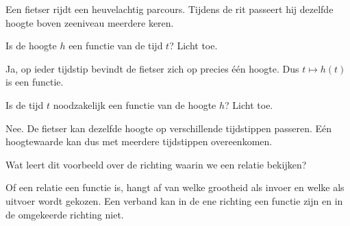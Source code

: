 \documentclass{ximera}
\begin{document}
\begin{oefening}{\oefG}

Een fietser rijdt een heuvelachtig parcours. Tijdens de rit passeert hij
dezelfde hoogte boven zeeniveau meerdere keren.

\begin{question}
Is de hoogte \(h\) een functie van de tijd \(t\)? Licht toe.

\begin{oplossing}
Ja, op ieder tijdstip bevindt de fietser zich op precies één hoogte.
Dus \(t\mapsto h(t)\) is een functie.
\end{oplossing}
\end{question}

\begin{question}
Is de tijd \(t\) noodzakelijk een functie van de hoogte \(h\)?
Licht toe.

\begin{oplossing}
Nee. De fietser kan dezelfde hoogte op verschillende tijdstippen passeren.
Eén hoogtewaarde kan dus met meerdere tijdstippen overeenkomen.
\end{oplossing}
\end{question}

\begin{question}
Wat leert dit voorbeeld over de richting waarin we een relatie bekijken?

\begin{oplossing}
Of een relatie een functie is, hangt af van welke grootheid als invoer
en welke als uitvoer wordt gekozen. Een verband kan in de ene richting
een functie zijn en in de omgekeerde richting niet.
\end{oplossing}
\end{question}

\end{oefening}

\end{document}
